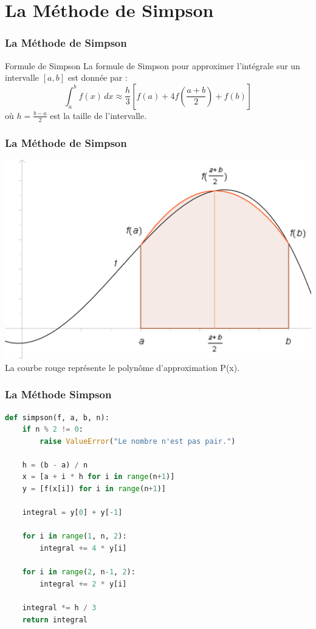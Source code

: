 \documentclass{beamer}
\begin{document}
\section{La Méthode de Simpson}
\begin{frame}
\frametitle{La Méthode de Simpson}

\begin{block}{Formule de Simpson}
La formule de Simpson pour approximer l'intégrale sur un intervalle $[a, b]$ est donnée par :
\[ \int_a^b f(x) \, dx \approx \frac{h}{3} \left[ f(a) + 4f\left(\frac{a+b}{2}\right) + f(b) \right] \]
où $h = \frac{b - a}{2}$ est la taille de l'intervalle.
\end{block}
\end{frame}

\begin{frame}
\frametitle{La Méthode de Simpson}
\begin{center}
\includegraphics[scale=0.15]{Simpson_rule.png} \\ La courbe rouge représente le polynôme d'approximation P(x).
\end{center}
\end{frame}

\begin{frame}[fragile]
\frametitle{La Méthode Simpson}
\begin{lstlisting}[language=Python]
def simpson(f, a, b, n):
    if n % 2 != 0:
        raise ValueError("Le nombre n'est pas pair.")
    
    h = (b - a) / n
    x = [a + i * h for i in range(n+1)]
    y = [f(x[i]) for i in range(n+1)]
    
    integral = y[0] + y[-1] 
    
    for i in range(1, n, 2):
        integral += 4 * y[i]
    
    for i in range(2, n-1, 2):
        integral += 2 * y[i]
    
    integral *= h / 3
    return integral
\end{lstlisting}
\end{frame}
\end{document}
